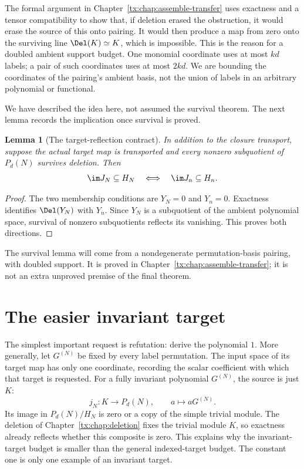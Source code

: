 \documentclass[11pt,a4paper,oneside,openany]{book}
\newtheorem{lemma}[theorem]{Lemma}
\theoremstyle{definition}\newtheorem{definition}[theorem]{Definition}
\theoremstyle{remark}\newtheorem{remark}[theorem]{Remark}
\numberwithin{equation}{chapter}
\begin{document}
The formal argument in Chapter~\ref{tx:chap:assemble-transfer} uses
exactness and a tensor compatibility to show that, if deletion erased
the obstruction, it would erase the source of this onto pairing.
It would then produce a map from zero onto the surviving line
$\Del(K)\simeq K$, which is impossible.
This is the reason for a doubled ambient support budget.
One monomial coordinate uses at most $kd$ labels; a pair of such
coordinates uses at most $2kd$. We are bounding the coordinates
of the pairing's ambient basis, not the union of labels in an
arbitrary polynomial or functional.

We have described the idea here, not assumed the survival theorem.
The next lemma records the implication once survival is proved.

\begin{lemma}[The target-reflection contract]\label{tx:lem:target-contract}
In addition to the closure transport, suppose the actual target map is
transported and every nonzero subquotient of $P_d(N)$ survives deletion.
Then
\[
        \im J_N\subseteq H_N\quad\Longleftrightarrow\quad
        \im J_n\subseteq H_n.
\]
\end{lemma}
\begin{proof}
The two membership conditions are $Y_N=0$ and $Y_n=0$.
Exactness identifies $\Del(Y_N)$ with $Y_n$. Since $Y_N$ is a
subquotient of the ambient polynomial space, survival of nonzero
subquotients reflects its vanishing. This proves both directions.
\end{proof}

The survival lemma will come from a nondegenerate permutation-basis
pairing, with doubled support. It is proved in
Chapter~\ref{tx:chap:assemble-transfer}; it is not an extra unproved
premise of the final theorem.

\section{The easier invariant target}
The simplest important request is refutation: derive the polynomial
$1$. More generally, let $G^{(N)}$ be fixed by every label permutation.
The input space of its target map has only one coordinate, recording
the scalar coefficient with which that target is requested.
For a fully invariant polynomial $G^{(N)}$, the source is just $K$:
\[
                   j_N:K\to P_d(N),\qquad a\mapsto aG^{(N)}.
\]
Its image in $P_d(N)/H_N$ is zero or a copy of the simple trivial
module. The deletion of Chapter~\ref{tx:chap:deletion} fixes the trivial
module $K$, so exactness already reflects
whether this composite is zero. This explains why the invariant-target
budget is smaller than the general indexed-target budget. The constant
one is only one example of an invariant target.
\end{document}
